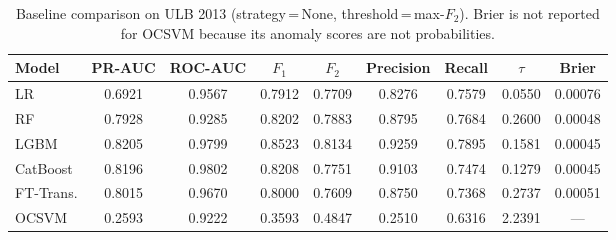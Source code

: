 \begin{table}[ht!]
\centering
\caption{Baseline comparison on ULB 2013 (strategy\,=\,None, threshold\,=\,max-$F_2$). Brier is not reported for OCSVM because its anomaly scores are not probabilities.}
\label{tab:baseline_ulb}
\begin{tabular}{l c c c c c c c c}
\toprule
Model & PR-AUC & ROC-AUC & $F_1$ & $F_2$ & Precision & Recall & $\tau$ & Brier \\
\midrule
LR         & 0.6921 & 0.9567 & 0.7912 & 0.7709 & 0.8276 & 0.7579 & 0.0550 & 0.00076 \\
RF         & 0.7928 & 0.9285 & 0.8202 & 0.7883 & 0.8795 & 0.7684 & 0.2600 & 0.00048 \\
LGBM       & 0.8205 & 0.9799 & 0.8523 & 0.8134 & 0.9259 & 0.7895 & 0.1581 & 0.00045 \\
CatBoost   & 0.8196 & 0.9802 & 0.8208 & 0.7751 & 0.9103 & 0.7474 & 0.1279 & 0.00045 \\
FT-Trans.  & 0.8015 & 0.9670 & 0.8000 & 0.7609 & 0.8750 & 0.7368 & 0.2737 & 0.00051 \\
OCSVM      & 0.2593 & 0.9222 & 0.3593 & 0.4847 & 0.2510 & 0.6316 & 2.2391 & --- \\
\bottomrule
\end{tabular}
\end{table}